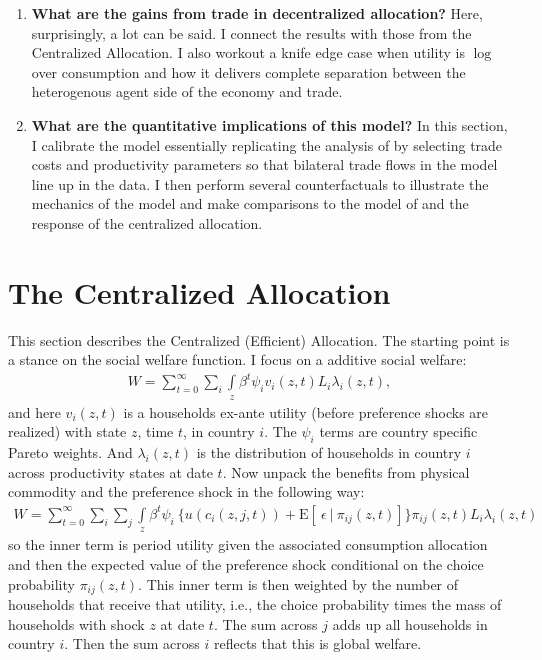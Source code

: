 \documentclass[12pt,pdftex]{article}
\begin{document}
\begin{onehalfspacing}
\begin{enumerate}
\item \textbf{What are the gains from trade in decentralized allocation?} Here, surprisingly, a lot can be said. I connect the results with those from the Centralized Allocation. I also workout a knife edge case when utility is $\log$ over consumption and how it delivers complete separation between the heterogenous agent side of the economy and trade.

\item \textbf{What are the quantitative implications of this model?} In this section, I calibrate the model essentially replicating the analysis of \citet{eaton2002technology} by selecting trade costs and productivity parameters so that bilateral trade flows in the model line up in the data. I then perform several counterfactuals to illustrate the mechanics of the model and make comparisons to the model of \citet{eaton2002technology} and the response of the centralized allocation.
\end{enumerate}

\section{The Centralized Allocation}

This section describes the Centralized (Efficient) Allocation. The starting point is a stance on the social welfare function. I focus on a additive social welfare:
\begin{align}
W = \sum_{t=0}^{\infty} \sum_{i}  \int\limits_{z} \beta^{t} \psi_{i} v_{i}(z,t) L_{i}\lambda_{i}(z,t),
\nonumber
\end{align}
and here $v_i(z,t)$ is a households ex-ante utility (before preference shocks are realized) with state $z$, time $t$, in country $i$. The $\psi_{i}$ terms are country specific Pareto weights. And $\lambda_{i}(z,t)$ is the distribution of households in country $i$ across productivity states at date $t$. Now unpack the benefits from physical commodity and the preference shock in the following way:
\begin{align}
W = \sum_{t=0}^{\infty}  \sum_{i} \sum_{j} \int\limits_{z}  \beta^{t} \psi_{i} \  \bigg \{  u(c_{i}(z, j, t) ) + \mathrm{E}[ \ \epsilon \ | \ \pi_{ij}(z,t) ] \bigg \}\pi_{ij}(z,t) L_{i} \lambda_{i}(z, t)
\label{eq:social-welfare-2}
\end{align}
so the inner term is period utility given the associated consumption allocation and then the expected value of the preference shock conditional on the choice probability $\pi_{ij}(z,t)$. This inner term is then weighted by the number of households that receive that utility, i.e., the choice probability times the mass of households with shock $z$ at date $t$. The sum across $j$ adds up all households in country $i$. Then the sum across $i$ reflects that this is global welfare.


\end{onehalfspacing}
\end{document}
